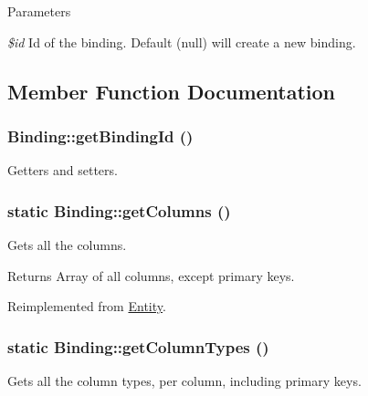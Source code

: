 \begin{DoxyParams}{Parameters}
\item[{\em \$id}]Id of the binding. Default (null) will create a new binding. \end{DoxyParams}


\subsection{Member Function Documentation}
\hypertarget{classBinding_a4b2ec4db2835ba983bdbb9bdba2d8d1c}{
\subsubsection[{getBindingId}]{\setlength{\rightskip}{0pt plus 5cm}Binding::getBindingId ()}}
\label{classBinding_a4b2ec4db2835ba983bdbb9bdba2d8d1c}
Getters and setters. \hypertarget{classBinding_a4caf9958cba0f34b8b08aae313afc9ec}{
\subsubsection[{getColumns}]{\setlength{\rightskip}{0pt plus 5cm}static Binding::getColumns ()}}
\label{classBinding_a4caf9958cba0f34b8b08aae313afc9ec}
Gets all the columns.

\begin{DoxyReturn}{Returns}
Array of all columns, except primary keys. 
\end{DoxyReturn}


Reimplemented from \hyperlink{classEntity_a394717a08ffd54ec9a14d06727c86719}{Entity}.

\hypertarget{classBinding_aded437d056ec24770d8bf4eebdeec36e}{
\subsubsection[{getColumnTypes}]{\setlength{\rightskip}{0pt plus 5cm}static Binding::getColumnTypes ()}}
\label{classBinding_aded437d056ec24770d8bf4eebdeec36e}
Gets all the column types, per column, including primary keys.

